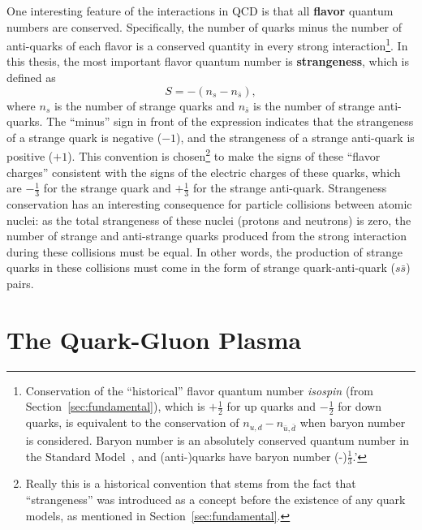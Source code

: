 One interesting feature of the interactions in QCD is that all \textbf{flavor} quantum numbers are conserved. Specifically, the number of quarks minus the number of anti-quarks of each flavor is a conserved quantity in every strong interaction\footnote{Conservation of the ``historical'' flavor quantum number \textit{isospin} (from Section~\ref{sec:fundamental}), which is $+\frac{1}{2}$ for up quarks and $-\frac{1}{2}$ for down quarks, is equivalent to the conservation of $n_{u,d} - n_{\bar{u}, \bar{d}}$ when baryon number is considered. Baryon number is an absolutely conserved quantum number in the Standard Model~\cite{PDG}, and (anti-)quarks have baryon number (-)$\frac{1}{3}$.'}. In this thesis, the most important flavor quantum number is \textbf{strangeness}, which is defined as
%
\begin{equation}
    \label{eq:strangeness}
    S = - (n_s - n_{\bar{s}}),
\end{equation}
where $n_s$ is the number of strange quarks and $n_{\bar{s}}$ is the number of strange anti-quarks. The ``minus'' sign in front of the expression indicates that the strangeness of a strange quark is negative ($-1$), and the strangeness of a strange anti-quark is positive ($+1$). This convention is chosen\footnote{Really this is a historical convention that stems from the fact that ``strangeness'' was introduced as a concept before the existence of any quark models, as mentioned in Section~\ref{sec:fundamental}.} to make the signs of these ``flavor charges'' consistent with the signs of the electric charges of these quarks, which are $-\frac{1}{3}$ for the strange quark and $+\frac{1}{3}$ for the strange anti-quark. Strangeness conservation has an interesting consequence for particle collisions between atomic nuclei: as the total strangeness of these nuclei (protons and neutrons) is zero, the number of strange and anti-strange quarks produced from the strong interaction during these collisions must be equal. In other words, the production of strange quarks in these collisions must come in the form of strange quark-anti-quark ($s\bar{s}$) pairs.



\section{The Quark-Gluon Plasma}
\label{sec:qgp_theory}

